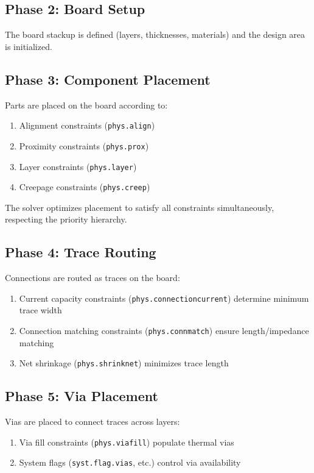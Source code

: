 \documentclass{report}
\begin{document}
\subsection{Phase 2: Board Setup}
The board stackup is defined (layers, thicknesses, materials) and the design area is initialized.

\subsection{Phase 3: Component Placement}
Parts are placed on the board according to:
\begin{enumerate}
\item Alignment constraints (\texttt{phys.align})
\item Proximity constraints (\texttt{phys.prox})
\item Layer constraints (\texttt{phys.layer})
\item Creepage constraints (\texttt{phys.creep})
\end{enumerate}

The solver optimizes placement to satisfy all constraints simultaneously, respecting the priority hierarchy.

\subsection{Phase 4: Trace Routing}
Connections are routed as traces on the board:
\begin{enumerate}
\item Current capacity constraints (\texttt{phys.connectioncurrent}) determine minimum trace width
\item Connection matching constraints (\texttt{phys.connmatch}) ensure length/impedance matching
\item Net shrinkage (\texttt{phys.shrinknet}) minimizes trace length
\end{enumerate}

\subsection{Phase 5: Via Placement}
Vias are placed to connect traces across layers:
\begin{enumerate}
\item Via fill constraints (\texttt{phys.viafill}) populate thermal vias
\item System flags (\texttt{syst.flag.vias}, etc.) control via availability
\end{enumerate}
\end{document}
